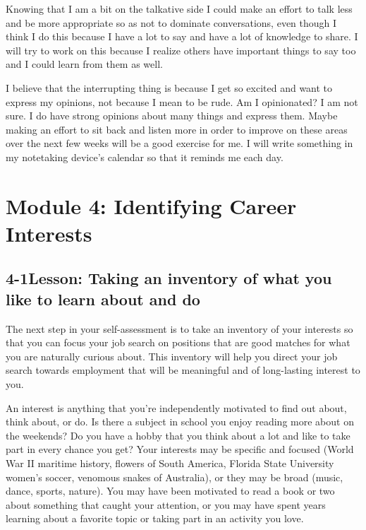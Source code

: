 Knowing that I am a bit on the talkative side I could make an effort to talk less and be more appropriate so as not to dominate conversations, even though I think I do this because I have a lot to say and have a lot of knowledge to share. I will try to work on this because I realize others have important things to say too and I could learn from them as well.

I believe that the interrupting thing is because I get so excited and want to express my opinions, not because I mean to be rude. Am I opinionated? I am not sure. I do have strong opinions about many things and express them. Maybe making an effort to sit back and listen more in order to improve on these areas over the next few weeks will be a good exercise for me. I will write something in my notetaking device's calendar so that it reminds me each day.
 
 
\pagebreak \section*{Module 4:  Identifying Career Interests}
\noindent\makebox[\textwidth]{\rule{\linewidth}{0.4pt}} 
\localtableofcontents 
\noindent\makebox[\textwidth]{\rule{\linewidth}{0.4pt}} 


\pagebreak \subsection*{4-1\quad Lesson: Taking an inventory of what you like to learn about and do}
The next step in your self-assessment is to take an inventory of your interests so that you can focus your job search on positions that are good matches for what you are naturally curious about. This inventory will help you direct your job search towards employment that will be meaningful and of long-lasting interest to you.

An interest is anything that you're independently motivated to find out about, think about, or do. Is there a subject in school you enjoy reading more about on the weekends? Do you have a hobby that you think about a lot and like to take part in every chance you get? Your interests may be specific and focused (World War II maritime history, flowers of South America, Florida State University women's soccer, venomous snakes of Australia), or they may be broad (music, dance, sports, nature). You may have been motivated to read a book or two about something that caught your attention, or you may have spent years learning about a favorite topic or taking part in an activity you love.

